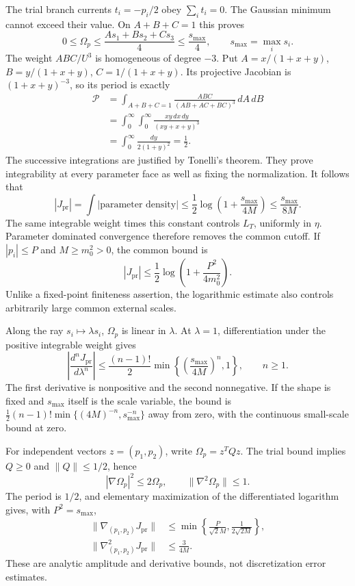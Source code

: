 The trial branch currents $t_i=-p_i/2$ obey $\sum_i t_i=0$. The Gaussian
minimum cannot exceed their value. On $A+B+C=1$ this proves
\[
 0\le\Omega_p\le\frac{As_1+Bs_2+Cs_3}{4}
                    \le\frac{s_{\max}}4,
 \qquad s_{\max}=\max_i s_i.
\]
The weight $ABC/U^3$ is homogeneous of degree $-3$. Put
$A=x/(1+x+y)$, $B=y/(1+x+y)$, $C=1/(1+x+y)$. Its projective Jacobian is
$(1+x+y)^{-3}$, so its period is exactly
\begin{align*}
 \mathcal P
 &=\int_{A+B+C=1}\frac{ABC}{(AB+AC+BC)^3}\,dA\,dB\\
 &=\int_0^\infty\int_0^\infty
             \frac{xy\,dx\,dy}{(xy+x+y)^3}\\
 &=\int_0^\infty\frac{dy}{2(1+y)^2}=\frac12.
\end{align*}
The successive integrations are justified by Tonelli's theorem. They prove
integrability at every parameter face as well as fixing the normalization.
It follows that
\[
 |J_{\mathrm{pr}}|=\int|\text{parameter density}|
 \le\frac12\log\left(1+\frac{s_{\max}}{4M}\right)
 \le\frac{s_{\max}}{8M}.
\]
The same integrable weight times this constant controls $L_T$, uniformly
in $\eta$. Parameter dominated convergence therefore removes the common
cutoff. If $|p_i|\le P$ and $M\ge m_0^2>0$, the common bound is
\[
 |J_{\mathrm{pr}}|\le
 \frac12\log\left(1+\frac{P^2}{4m_0^2}\right).
\]
Unlike a fixed-point finiteness assertion, the logarithmic estimate also
controls arbitrarily large common external scales.

Along the ray $s_i\mapsto\lambda s_i$, $\Omega_p$ is linear in $\lambda$.
At $\lambda=1$, differentiation under the positive integrable weight gives
\[
 \left|\frac{d^nJ_{\mathrm{pr}}}{d\lambda^n}\right|
 \le\frac{(n-1)!}{2}
       \min\left\{\left(\frac{s_{\max}}{4M}\right)^n,1\right\},
 \qquad n\ge1.
\]
The first derivative is nonpositive and the second nonnegative. If the
shape is fixed and $s_{\max}$ itself is the scale variable, the bound is
$\frac12(n-1)!\min\{(4M)^{-n},s_{\max}^{-n}\}$ away from zero,
with the continuous small-scale bound at zero.

For independent vectors $z=(p_1,p_2)$, write $\Omega_p=z^TQz$. The trial
bound implies $Q\ge0$ and $\|Q\|\le1/2$, hence
\[
 |\nabla\Omega_p|^2\le2\Omega_p,\qquad
 \|\nabla^2\Omega_p\|\le1.
\]
The period is $1/2$, and elementary maximization of the differentiated
logarithm gives, with $P^2=s_{\max}$,
\begin{align*}
 \|\nabla_{(p_1,p_2)}J_{\mathrm{pr}}\|
 &\le\min\left\{\frac{P}{\sqrt2 M},
                         \frac1{2\sqrt{2M}}\right\},\\
 \|\nabla^2_{(p_1,p_2)}J_{\mathrm{pr}}\|
 &\le\frac3{4M}.
\end{align*}
These are analytic amplitude and derivative bounds, not discretization
error estimates.

